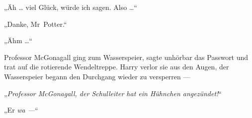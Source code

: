 „Äh … viel Glück, würde ich sagen. Also …“

„Danke, Mr~Potter.“

„Ähm …“

Professor McGonagall ging zum Wasserspeier, sagte unhörbar das Passwort und trat auf die rotierende Wendeltreppe. Harry verlor sie aus den Augen, der Wasserspeier begann den Durchgang wieder zu versperren —

„\emph{Professor McGonagall, der Schulleiter hat ein Hühnchen angezündet!}“

„Er \emph{wa —}“

